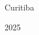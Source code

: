\begin{folharosto}

\begin{center}
\theauthor \\
\theauthorr \\
\end{center}
\ \\
\ \\
\ \\
\ \\
\ \\
\begin{spacing}{2}
   \begin{center}
   {\LARGE {\bf \thetitle}}
   \end{center}
\end{spacing}
\ \\
\ \\
\ \\
\vspace*{85mm}







\ \\
\ \\
\ \\
\ \\
   \begin{center}
   Curitiba \par
   \theuniversity \par
   2025
   \end{center}

\end{folharosto}
